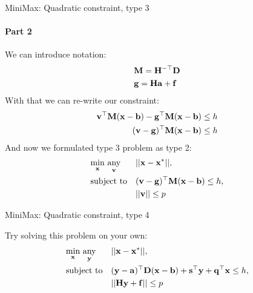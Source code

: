 \documentclass{beamer}
\begin{document}
\begin{frame}{MiniMax: Quadratic constraint, type 3}
\framesubtitle{Part 2}
\begin{flushleft}

We can introduce notation:
%
\begin{align}
    & \mathbf{M} = \mathbf{H}^{-\top} \mathbf{D} \\
    & \mathbf{g} = \mathbf{H}\mathbf{a} + \mathbf{f}
\end{align}
With that we can re-write our constraint:
%
\begin{align}
    \mathbf{v}^\top \mathbf{M} (\mathbf{x} - \mathbf{b}) - \mathbf{g}^\top \mathbf{M} (\mathbf{x} - \mathbf{b}) \leq h \\
    (\mathbf{v} - \mathbf{g})^\top \mathbf{M} (\mathbf{x} - \mathbf{b}) \leq h 
\end{align}
%
And now we formulated type 3 problem as type 2:
%
\begin{equation}
\begin{aligned}
& \underset{\mathbf{x}}{\text{min}} \ \underset{\mathbf{v}}{\text{any}}
& & ||\mathbf{x} - \mathbf{x}^*||, \\
& \text{subject to}
& & (\mathbf{v} - \mathbf{g})^\top \mathbf{M} (\mathbf{x} - \mathbf{b}) \leq h, \\
& & & ||\mathbf{v}|| \leq p
\end{aligned}
\end{equation}

 
\end{flushleft}
\end{frame}



\begin{frame}{MiniMax: Quadratic constraint, type 4}
\begin{flushleft}

Try solving this problem on your own:
%
\begin{equation}
\begin{aligned}
& \underset{\mathbf{x}}{\text{min}} \ \underset{\mathbf{y}}{\text{any}}
& & ||\mathbf{x} - \mathbf{x}^*||, \\
& \text{subject to}
& & (\mathbf{y} - \mathbf{a})^\top \mathbf{D} (\mathbf{x} - \mathbf{b})  + 
\mathbf{s}^\top \mathbf{y} + \mathbf{q}^\top \mathbf{x} \leq h, \\
& & & ||\mathbf{H}\mathbf{y} + \mathbf{f}|| \leq p
\end{aligned}
\end{equation}
 
\end{flushleft}
\end{frame}
\end{document}
